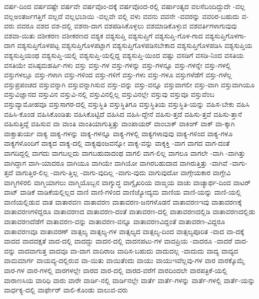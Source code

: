 {ವರ್ಷ-ದಿಂದ
ವರ್ಷವಷ್ಟೇ
ವರ್ಷವೇ
ವರ್ಷವೊಂ-ದಕ್ಕೆ
ವರ್ಷವೊಂದ-ರಲ್ಲಿ
ವರ್ಷಾಂತ್ಯದ
ವಲಸೆಬಂದಿದ್ದುದೇ
-ವಲ್ಲ
ವಲ್ಲಅಂತರ್ಜಗತ್ತಿಗೆ
ವಲ್ಲದೆ
ವಲ್ಲಭಬಾಯಿ
-ವಲ್ಲವೇ
ವಲ್ಲಿ
ವಳು
ವವನು
ವವನೇ
-ವವರನ್ನು
ವವರಿರ-ಬಹುದು
ವ-ವರು
ವವರೂ
ವಶದ
ವಶ-ದಲ್ಲಿ
ವಶನಾ-ದಾಗ
ವಶಪಡಿಸಿಕೊಳ್ಳಲು
ವಶಮಾಡಿಕೊಳ್ಳುವ
ವಶವರ್ತಿಗಳಾಗುವುವು
ವಶವಾ-ಯಿತು
ವಶೀಕರಣ
ವಶೀಕರಣದ
ವಶ್ಯಕ
ವಶ್ಯಸುಪ್ತಿ
ವಶ್ಯಸುಪ್ತಿಗೆ
ವಶ್ಯಸುಪ್ತಿ-ಗೊಳ-ಗಾದ
ವಶ್ಯಸುಪ್ತಿಗೊಳಗಾ-ದಾಗ
ವಶ್ಯಸುಪ್ತಿಗೊಳಪಟ್ಟ
ವಶ್ಯಸುಪ್ತಿಗೊಳಪಟ್ಟಾಗ
ವಶ್ಯಸುಪ್ತಿಗೊಳಪಡಿಸಬೇಕಾದ
ವಶ್ಯಸುಪ್ತಿಗೊಳಪಡಿಸಿ
ವಶ್ಯಸುಪ್ತಿಯ
ವಶ್ಯಸುಪ್ತಿಯಂಥ
ವಶ್ಯಸುಪ್ತಿ-ಯಲ್ಲಿ
ವಶ್ಯಸುಪ್ತಿ-ಯಲ್ಲಿದ್ದ
ವಶ್ಯಸುಪ್ತಿ-ಯಿಂದ
ವಷ್ಟು
ವಸಡಿಗೆ
ವಸಡಿ-ನಿಂದ
ವಸತಿಯ
ವಸತಿಯೇ
ವಸಿಷ್ಠಮಹರ್ಷಿ-ಗಳು
ವಸ್ತು
ವಸ್ತು-ಗಳ
ವಸ್ತು-ಗಳನ್ನು
ವಸ್ತು-ಗಳನ್ನೂ
ವಸ್ತು-ಗಳನ್ನೇ
ವಸ್ತು-ಗಳಲ್ಲಿ
ವಸ್ತುಗಳಲ್ಲೂ
ವಸ್ತು-ಗಳಾಗಿ
ವಸ್ತು-ಗಳಿಂದ
ವಸ್ತು-ಗಳಿಗೆ
ವಸ್ತು-ಗಳು
ವಸ್ತು-ಗಳೂ
ವಸ್ತುಗಳೆಡೆಗೆ
ವಸ್ತು-ಗಳೆಲ್ಲ
ವಸ್ತುಪ್ರಪಂಚದ
ವಸ್ತುವನ್ನಾಗಿ
ವಸ್ತುವನ್ನಾಗಿಸುವ
ವಸ್ತು-ವನ್ನು
ವಸ್ತು-ವನ್ನೂ
ವಸ್ತುವಾಗಲೀ
ವಸ್ತು-ವಾಗಿ
ವಸ್ತುವಾಗಿಯೂ
ವಸ್ತುವಿಜ್ಞಾನದ
ವಸ್ತುವಿನ
ವಸ್ತುವಿ-ನಲ್ಲಿ
ವಸ್ತುವಿನಲ್ಲಿಲ್ಲ
ವಸ್ತುವಿನಲ್ಲೇ
ವಸ್ತುವು
ವಸ್ತುವೂ
ವಸ್ತುವೆಂಬ
ವಸ್ತುವ್ಯಾಮೋಹವೂ
ವಸ್ತುಸಾಗರ-ದಲ್ಲಿ
ವಸ್ತುಸ್ಥಿತಿ
ವಸ್ತುಸ್ಥಿತಿಗೂ
ವಸ್ತುಸ್ಥಿತಿಯ
ವಸ್ತುಸ್ಥಿತಿ-ಯನ್ನು
ವಹಿಸ-ಬೇಕು
ವಹಿಸಿ
ವಹಿಸಿ-ಕೊಂಡ
ವಹಿಸಿಕೊಂಡಿತು
ವಹಿಸಿಕೊಟ್ಟಿದೆ
ವಹಿಸಿದ
ವಹಿಸಿ-ದ್ದೇನೆ
ವಹಿಸು-ತ್ತದೆ
ವಹಿಸು-ತ್ತವೆ
ವಹಿಸು-ತ್ತಾನೆ
ವಹಿಸುತ್ತಿದ್ದೆ
ವಹಿಸುವ
ವಾ
ವಾಂತಿ
ವಾಂತಿಯಾಗುತ್ತಿತ್ತು
ವಾಂಪಾಯರ್
ವಾಂಬಾಕ್
ವಾಕಿಂಗ್
ವಾಕ್
ವಾ-ಕ್ಕಾಗಿ
ವಾಕ್ಚಾತುರ್ಯ
ವಾಕ್ಯ
ವಾಕ್ಯ-ಗಳನ್ನು
ವಾಕ್ಯ-ಗಳನ್ನೂ
ವಾಕ್ಯ-ಗಳಲ್ಲಿ
ವಾಕ್ಯಗಳಾವುವು
ವಾಕ್ಯ-ಗಳಿಂದ
ವಾಕ್ಯ-ಗಳೂ
ವಾಕ್ಯಗಳೊಂದಿಗೆ
ವಾಕ್ಯದ
ವಾಕ್ಯ-ದಲ್ಲಿ
ವಾಕ್ಯಪುಂಜವನ್ನೋ
ವಾಕ್ಯ-ವನ್ನು
ವಾಕ್ಶಕ್ತಿ
-ವಾಗ
ವಾಗದ
ವಾಗ-ದಂತೆ
ವಾಗದಿದ್ದಲ್ಲಿ
ವಾಗದು
ವಾಗಬಲ್ಲದು
ವಾಗಬಹುದಾದಂಥ
ವಾಗಲಿ
ವಾಗ-ಲಿಲ್ಲ
ವಾಗಲೂ
ವಾಗಲೇ
-ವಾಗಿ
-ವಾಗಿತ್ತು
ವಾಗಿದ್ದಾಗ
ವಾಗಿ-ಯಾದರೂ
ವಾಗಿಯೂ
ವಾಗಿಯೇ
ವಾಗಿಯೋ
ವಾಗಿರಬಹುದಾದ
ವಾಗಿರುತ್ತಿತ್ತು
-ವಾಗಿವೆ
-ವಾಗು-ತ್ತದೆ
ವಾಗುತ್ತಿರ-ಲಿಲ್ಲ
-ವಾಗು-ತ್ತಿಲ್ಲ
-ವಾಗು-ವುದಿಲ್ಲ
-ವಾಗು-ವುದು
ವಾಗುವುದೋ
ವಾಗ್ಗೇಯಕಾರ
ವಾಗ್ದೇವಿ
ವಾಗ್ಮಿಗಳಿರಲಿ
ವಾಗ್ಮಿಯಾಗಲು
ವಾಗ್ಮಿಯೊಬ್ಬನ
ವಾಗ್ಯುದ್ಧ
ವಾಗ್ವೈಖರಿಯ
ವಾಙ್ಮಯ
ವಾಚು
ವಾಚ್ಯಾರ್ಥ-ದಿಂದ
ವಾಟರ್
ವಾಟ್
ವಾಡಿಕೆ
ವಾಡಿಕೆಯಲ್ಲಿಲ್ಲದ
ವಾಣಿ
ವಾಣಿ-ಗಳಿಂದ
ವಾಣಿಜ್ಯೋದ್ಯಮ
ವಾಣಿಯ
ವಾಣಿ-ಯನ್ನು
ವಾಣಿ-ಯಲ್ಲಿ
ವಾಣಿಯಲ್ಲಿಡುವ
ವಾತ
ವಾತಾರವಣ
ವಾತಾವರಣ
ವಾತಾವರಣ-ಜನಗಳೊಡನೆ
ವಾತಾವರಣಇವು
ವಾತಾವರಣಕ್ಕೆ
ವಾತಾವರಣಗಳಿದ್ದರೂ
ವಾತಾವರಣದ
ವಾತಾವರಣ-ದಂತೆ
ವಾತಾವರಣ-ದಲ್ಲಿ
ವಾತಾವರಣದಲ್ಲಿಡಿ
ವಾತಾವರಣದಲ್ಲಿಡು
ವಾತಾವರಣದೆಡೆಗೆ
ವಾತಾವರಣ-ವನ್ನು
ವಾತಾವರಣ-ವನ್ನೂ
ವಾತಾವರಣವಿದ್ದಂತೆ
ವಾತಾವರಣ-ವಿದ್ದರೂ
ವಾತಾವರಣವೂ
ವಾತಾವರಣ್
ವಾತ್ಸಲ್ಯ
ವಾತ್ಸಲ್ಯ-ಗಳ
ವಾತ್ಸಲ್ಯದ
ವಾತ್ಸಲ್ಯ-ದಿಂದ
ವಾತ್ಸಲ್ಯಪೂರಿತ
-ವಾದ
ವಾ-ದಕ್ಕೆ
ವಾದದ
ವಾದದಕ್ಷತೆ
ವಾದ-ದಲ್ಲಿ
ವಾದದ್ದು
ವಾದನ-ದಲ್ಲಿ
ವಾದನಪಟು-ಗಳ
ವಾದಪ್ರಿಯ
-ವಾದರೂ
-ವಾದರೆ
ವಾದ-ವನ್ನು
ವಾದವಾಗುತ್ತ
ವಾದವೂ
ವಾ-ದಾಗ
ವಾದಿರಾಜ
ವಾದಿಸ-ಬಹುದು
ವಾದುದಲ್ಲ
-ವಾದುದು
ವಾದ್ಯ
ವಾದ್ಯದ
ವಾಮಮಾರ್ಗ
ವಾಯವ್ಯ-ದಲ್ಲಿರುವ
ವಾ-ಯಿತು
ವಾಯಿತೆಂದು
ವಾಯು
ವಾಯುಇವೆಲ್ಲವು-ಗಳ
ವಾರ
ವಾರಕ್ಕೊಮ್ಮೆ
ವಾರ-ಗಳ
ವಾರ-ಗಳಲ್ಲಿ
ವಾರಗಳಲ್ಲೇ
ವಾರದ
ವಾರ-ದಲ್ಲಿ
ವಾರದ-ವರೆಗೆ
ವಾರದಿಂದಲೇ
ವಾರಪತ್ರಿಕೆ-ಯಲ್ಲಿ
ವಾರಾಣಸಿಯ
ವಾರಿಧಿ
ವಾರು
ವಾರೇ
ವಾರ್ಡಿ-ನಲ್ಲಿ
ವಾರ್ಡಿನಲ್ಲೇ
ವಾರ್ತೆ
ವಾರ್ತೆ-ಗಳನ್ನು
ವಾರ್ತೆ-ಗಳಲ್ಲಿ
ವಾರ್ತೆ-ಯನ್ನು
ವಾರ್ಧಕ್ಯ-ದಲ್ಲಿ
ವಾರ್ಫೇರ್
ವಾಲಿ-ಕೊಂಡು
ವಾಲುವ-ವರು
}
